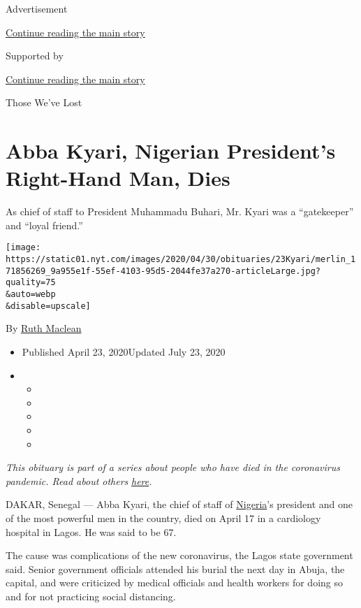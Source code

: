 Advertisement

\protect\hyperlink{after-top}{Continue reading the main story}

Supported by

\protect\hyperlink{after-sponsor}{Continue reading the main story}

Those We've Lost

\hypertarget{abba-kyari-nigerian-presidents-right-hand-man-dies}{%
\section{Abba Kyari, Nigerian President's Right-Hand Man,
Dies}\label{abba-kyari-nigerian-presidents-right-hand-man-dies}}

As chief of staff to President Muhammadu Buhari, Mr. Kyari was a
``gatekeeper'' and ``loyal friend.''

\texttt{[image: https://static01.nyt.com/images/2020/04/30/obituaries/23Kyari/merlin\_171856269\_9a955e1f-55ef-4103-95d5-2044fe37a270-articleLarge.jpg?quality=75\\\&auto=webp\\\&disable=upscale]}

By \href{https://www.nytimes.com/by/ruth-maclean}{Ruth Maclean}

\begin{itemize}
\item
  Published April 23, 2020Updated July 23, 2020
\item
  \begin{itemize}
  \item
  \item
  \item
  \item
  \item
  \end{itemize}
\end{itemize}

\emph{This obituary is part of a series about people who have died in
the coronavirus pandemic. Read about others}
\href{https://www.nytimes.com/series/people-who-have-died-of-the-coronavirus}{\emph{here}}\emph{.}

DAKAR, Senegal --- Abba Kyari, the chief of staff of
\href{https://www.nytimes.com/2020/07/23/world/africa/aid-workers-executed-nigeria.html}{Nigeria}'s
president and one of the most powerful men in the country, died on April
17 in a cardiology hospital in Lagos. He was said to be 67.

The cause was complications of the new coronavirus, the Lagos state
government said. Senior government officials attended his burial the
next day in Abuja, the capital, and were criticized by medical officials
and health workers for doing so and for not practicing social
distancing.

